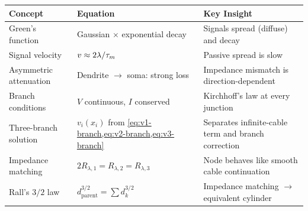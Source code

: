 \begin{chaptersummary}

\begin{center}
\renewcommand{\arraystretch}{1.6}
\begin{tabularx}{\textwidth}{@{}l X X@{}}
  \toprule
  \textbf{Concept} & \textbf{Equation} & \textbf{Key Insight} \\
  \midrule
  Green's function &
  Gaussian $\times$ exponential decay &
  Signals spread (diffuse) and decay \\
  Signal velocity &
  $v \approx 2\lambda/\tau_m$ &
  Passive spread is slow \\
  Asymmetric attenuation &
  Dendrite $\to$ soma: strong loss &
  Impedance mismatch is direction-dependent \\
  Branch conditions &
  $V$ continuous, $I$ conserved &
  Kirchhoff's law at every junction \\
  Three-branch solution &
  $v_i(x_i)$ from \cref{eq:v1-branch,eq:v2-branch,eq:v3-branch} &
  Separates infinite-cable term and branch correction \\
  Impedance matching &
  $2R_{\lambda,1}=R_{\lambda,2}=R_{\lambda,3}$ &
  Node behaves like smooth cable continuation \\
  Rall's $3/2$ law &
  $d_{\text{parent}}^{3/2} = \sum d_k^{3/2}$ &
  Impedance matching $\to$ equivalent cylinder \\
  \bottomrule
\end{tabularx}
\end{center}

\end{chaptersummary}

